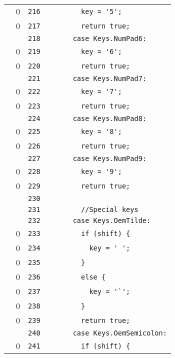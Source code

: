\documentclass[a4paper,10pt]{article}
\begin{document}
\begin{longtable}[l]{lrrl}
\cellcolor{red} & 0 & \verb~216~ & \verb~        key = '5';~\\
\cellcolor{red} & 0 & \verb~217~ & \verb~        return true;~\\
\cellcolor{gray} &  & \verb~218~ & \verb~      case Keys.NumPad6:~\\
\cellcolor{red} & 0 & \verb~219~ & \verb~        key = '6';~\\
\cellcolor{red} & 0 & \verb~220~ & \verb~        return true;~\\
\cellcolor{gray} &  & \verb~221~ & \verb~      case Keys.NumPad7:~\\
\cellcolor{red} & 0 & \verb~222~ & \verb~        key = '7';~\\
\cellcolor{red} & 0 & \verb~223~ & \verb~        return true;~\\
\cellcolor{gray} &  & \verb~224~ & \verb~      case Keys.NumPad8:~\\
\cellcolor{red} & 0 & \verb~225~ & \verb~        key = '8';~\\
\cellcolor{red} & 0 & \verb~226~ & \verb~        return true;~\\
\cellcolor{gray} &  & \verb~227~ & \verb~      case Keys.NumPad9:~\\
\cellcolor{red} & 0 & \verb~228~ & \verb~        key = '9';~\\
\cellcolor{red} & 0 & \verb~229~ & \verb~        return true;~\\
\cellcolor{gray} &  & \verb~230~ & \verb~~\\
\cellcolor{gray} &  & \verb~231~ & \verb~        //Special keys~\\
\cellcolor{gray} &  & \verb~232~ & \verb~      case Keys.OemTilde:~\\
\cellcolor{red} & 0 & \verb~233~ & \verb~        if (shift) {~\\
\cellcolor{red} & 0 & \verb~234~ & \verb~          key = ' ';~\\
\cellcolor{red} & 0 & \verb~235~ & \verb~        }~\\
\cellcolor{red} & 0 & \verb~236~ & \verb~        else {~\\
\cellcolor{red} & 0 & \verb~237~ & \verb~          key = '`';~\\
\cellcolor{red} & 0 & \verb~238~ & \verb~        }~\\
\cellcolor{red} & 0 & \verb~239~ & \verb~        return true;~\\
\cellcolor{gray} &  & \verb~240~ & \verb~      case Keys.OemSemicolon:~\\
\cellcolor{red} & 0 & \verb~241~ & \verb~        if (shift) {~\\

\end{longtable}
\end{document}
